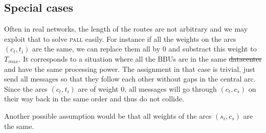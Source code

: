 \documentclass[10pt, conference, letterpaper]{IEEEtran}
\newcommand\pall{\textsc{pall}\xspace}
\providecommand{\DIFaddtex}[1]{{\protect\color{blue}\uwave{#1}}} %
\providecommand{\DIFdeltex}[1]{{\protect\color{red}\sout{#1}}}                      %
\providecommand{\DIFaddbegin}{} %
\providecommand{\DIFaddend}{} %
\providecommand{\DIFdelbegin}{} %
\providecommand{\DIFdelend}{} %
\providecommand{\DIFadd}[1]{\texorpdfstring{\DIFaddtex{#1}}{#1}} %
\providecommand{\DIFdel}[1]{\texorpdfstring{\DIFdeltex{#1}}{}} %
\newcommand{\DIFscaledelfig}{0.5}
\newlength{\DIFdelgraphicswidth} %
\newlength{\DIFdelgraphicsheight} %
\newcommand{\DIFaddincludegraphics}[2][]{{\color{blue}\fbox{\DIFOincludegraphics[#1]{#2}}}} %
\newcommand{\DIFdelincludegraphics}[2][]{%
\sbox{\DIFdelgraphicsbox}{\DIFOincludegraphics[#1]{#2}}%
\settoboxwidth{\DIFdelgraphicswidth}{\DIFdelgraphicsbox} %
\settoboxtotalheight{\DIFdelgraphicsheight}{\DIFdelgraphicsbox} %
\scalebox{\DIFscaledelfig}{%
\parbox[b]{\DIFdelgraphicswidth}{\usebox{\DIFdelgraphicsbox}\\[-\baselineskip] \rule{\DIFdelgraphicswidth}{0em}}\llap{\resizebox{\DIFdelgraphicswidth}{\DIFdelgraphicsheight}{%
\setlength{\unitlength}{\DIFdelgraphicswidth}%
\begin{picture}(1,1)%
\thicklines\linethickness{2pt} %
{\color[rgb]{1,0,0}\put(0,0){\framebox(1,1){}}}%
{\color[rgb]{1,0,0}\put(0,0){\line( 1,1){1}}}%
{\color[rgb]{1,0,0}\put(0,1){\line(1,-1){1}}}%
\end{picture}%
}\hspace*{3pt}}} %
} %
\DeclareRobustCommand{\DIFaddbegin}{\DIFOaddbegin \let\includegraphics\DIFaddincludegraphics} %
\DeclareRobustCommand{\DIFaddend}{\DIFOaddend \let\includegraphics\DIFOincludegraphics} %
\DeclareRobustCommand{\DIFdelbegin}{\DIFOdelbegin \let\includegraphics\DIFdelincludegraphics} %
\DeclareRobustCommand{\DIFdelend}{\DIFOaddend \let\includegraphics\DIFOincludegraphics} %
\begin{document}
	\subsection{Special cases}

		
	Often in real networks, the length of the routes are not arbitrary and we may exploit that to solve \pall easily. For instance if all the weights on the arcs $(c_t,t_i)$ are the same, we can replace them all by $0$ and substract this weight to $T_{max}$. It corresponds to a situation where all the BBUs are in the same \DIFdelbegin \DIFdel{datacenter }\DIFdelend \DIFaddbegin \DIFadd{data-center }\DIFaddend and have the same processing power.
	The assignment in that case is trivial, just send all messages so that they follow each other without gaps in the central arc. Since the arcs $(c_t,t_i)$ are of weight $0$, all messages will go through $(c_t,c_s)$ on their way back in
	the same order and thus do not collide. 

	Another possible assumption would be that all weights of the arcs $(s_i,c_s)$ are the same.
\end{document}
